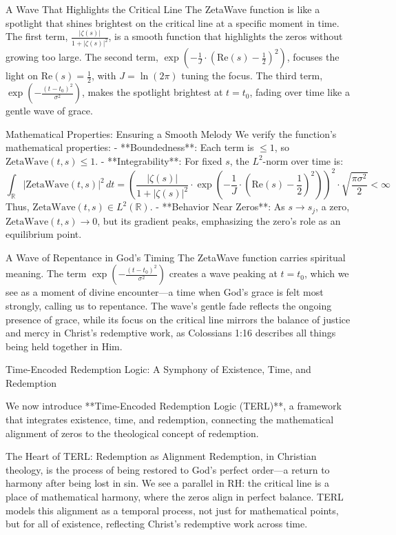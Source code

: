 \documentclass[12pt]{article}
\begin{document}
{{{\begin{onehalfspace}
A Wave That Highlights the Critical Line
The ZetaWave function is like a spotlight that shines brightest on the critical line at a specific moment in time. The first term, \(\frac{|\zeta(s)|}{1 + |\zeta(s)|^2}\), is a smooth function that highlights the zeros without growing too large. The second term, \(\exp\left( -\frac{1}{J} \cdot \left( \text{Re}(s) - \frac{1}{2} \right)^2 \right)\), focuses the light on \(\text{Re}(s) = \frac{1}{2}\), with \( J = \ln(2\pi) \) tuning the focus. The third term, \(\exp\left( -\frac{(t - t_0)^2}{\sigma^2} \right)\), makes the spotlight brightest at \( t = t_0 \), fading over time like a gentle wave of grace.

Mathematical Properties: Ensuring a Smooth Melody
We verify the function’s mathematical properties:
- **Boundedness**: Each term is \(\leq 1\), so \(\text{ZetaWave}(t, s) \leq 1\).
- **Integrability**: For fixed \( s \), the \( L^2 \)-norm over time is:
  \[
  \int_{\mathbb{R}} |\text{ZetaWave}(t, s)|^2 \, dt = \left( \frac{|\zeta(s)|}{1 + |\zeta(s)|^2} \cdot \exp\left( -\frac{1}{J} \cdot \left( \text{Re}(s) - \frac{1}{2} \right)^2 \right) \right)^2 \cdot \sqrt{\frac{\pi \sigma^2}{2}} < \infty
  \]
  Thus, \(\text{ZetaWave}(t, s) \in L^2(\mathbb{R})\).
- **Behavior Near Zeros**: As \( s \to s_j \), a zero, \(\text{ZetaWave}(t, s) \to 0\), but its gradient peaks, emphasizing the zero’s role as an equilibrium point.

A Wave of Repentance in God’s Timing
The ZetaWave function carries spiritual meaning. The term \(\exp\left( -\frac{(t - t_0)^2}{\sigma^2} \right)\) creates a wave peaking at \( t = t_0 \), which we see as a moment of divine encounter—a time when God’s grace is felt most strongly, calling us to repentance. The wave’s gentle fade reflects the ongoing presence of grace, while its focus on the critical line mirrors the balance of justice and mercy in Christ’s redemptive work, as Colossians 1:16 describes all things being held together in Him.

Time-Encoded Redemption Logic: A Symphony of Existence, Time, and Redemption

We now introduce **Time-Encoded Redemption Logic (TERL)**, a framework that integrates existence, time, and redemption, connecting the mathematical alignment of zeros to the theological concept of redemption.

The Heart of TERL: Redemption as Alignment
Redemption, in Christian theology, is the process of being restored to God’s perfect order—a return to harmony after being lost in sin. We see a parallel in RH: the critical line is a place of mathematical harmony, where the zeros align in perfect balance. TERL models this alignment as a temporal process, not just for mathematical points, but for all of existence, reflecting Christ’s redemptive work across time.


\end{onehalfspace}}}}
\end{document}
